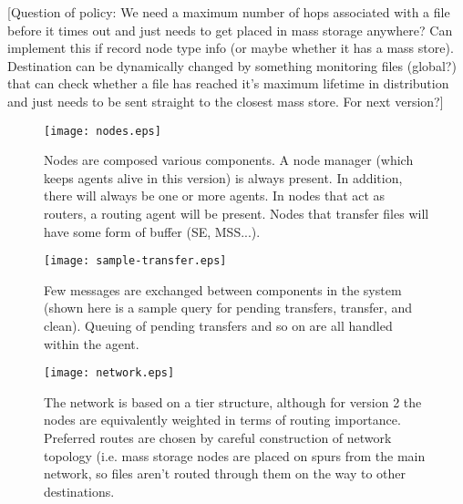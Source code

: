 \documentclass{cmspaper}
\begin{document}
[Question of policy: We need a maximum number of hops associated with
a file before it times out and just needs to get placed in mass
storage anywhere?  Can implement this if record node type info (or
maybe whether it has a mass store).  Destination can be dynamically
changed by something monitoring files (global?) that can check whether
a file has reached it's maximum lifetime in distribution and just
needs to be sent straight to the closest mass store. For next
version?]

\clearpage
\begin{figure}
\centering
\texttt{[image: nodes.eps]}
\caption{Nodes are composed various components. A node manager (which keeps agents alive in this version) is always present. In addition, there will always be one or more agents. In nodes that act as routers, a routing agent will be present. Nodes that transfer files will have some form of buffer (SE, MSS...).}
\label{nodes}
\end{figure}

\clearpage
\begin{figure}
\centering
\texttt{[image: sample-transfer.eps]}
\caption{Few messages are exchanged between components in the system (shown here is a sample query for pending transfers, transfer, and clean). Queuing of pending transfers and so on are all handled within the agent.}
\label{sample-transfer}
\end{figure}

\clearpage
\begin{figure}
\centering
\texttt{[image: network.eps]}
\caption{The network is based on a tier structure, although for version 2 the nodes are equivalently weighted in terms of routing importance. Preferred routes are chosen by careful construction of network topology (i.e. mass storage nodes are placed on spurs from the main network, so files aren't routed through them on the way to other destinations.}
\label{network}
\end{figure}
\end{document}
